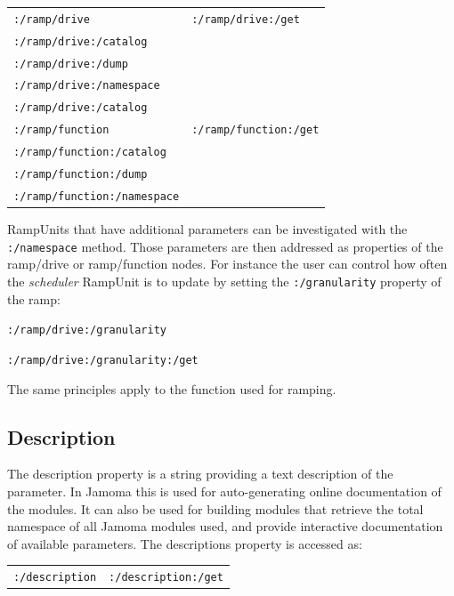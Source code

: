 \documentclass{NIME-alternate}
\begin{document}
\begin{tabular}{ll}
	\texttt{:/ramp/drive} & \texttt{:/ramp/drive:/get} \\
	\texttt{:/ramp/drive:/catalog} \\
	\texttt{:/ramp/drive:/dump} \\
	\texttt{:/ramp/drive:/namespace} \\
	\texttt{:/ramp/drive:/catalog} \\
	\texttt{:/ramp/function}  & \texttt{:/ramp/function:/get} \\
	\texttt{:/ramp/function:/catalog} \\
	\texttt{:/ramp/function:/dump} \\
	\texttt{:/ramp/function:/namespace} \\
\end{tabular}

RampUnits that have additional parameters can be investigated with the \texttt{:/namespace} method. Those parameters are then addressed as properties of the ramp/drive or ramp/function nodes.  For instance the user can control how often the \emph{scheduler} RampUnit is to update by setting the \texttt{:/granularity} property of the ramp:

\texttt{:/ramp/drive:/granularity}

\texttt{:/ramp/drive:/granularity:/get}

The same principles apply to the function used for ramping. 








\subsection{Description} %
\label{sub:description}

The description property is a string providing a text description of the parameter. In Jamoma this is used for auto-generating online documentation of the modules. It can also be used for building modules that retrieve the total namespace of all Jamoma modules used, and provide interactive documentation of available parameters. The descriptions property is accessed as:

\begin{tabular}{ll}
	\texttt{:/description} & \texttt{:/description:/get} \\
\end{tabular}
\end{document}
